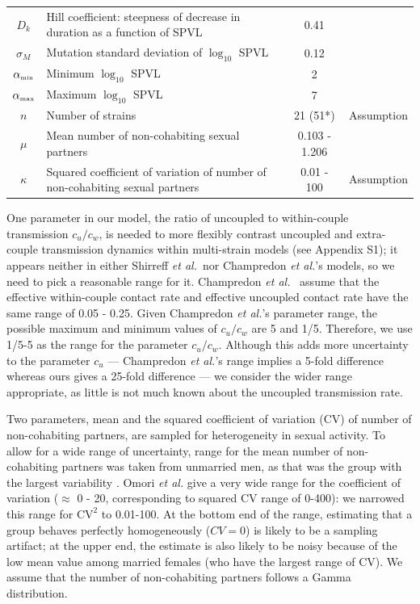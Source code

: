 \documentclass[10pt,letterpaper]{article}
\newcommand{\etal}{\textit{et al.}}
\newcommand{\tsub}[2]{#1_{{\textrm{\tiny #2}}}}
\begin{document}
\begin{table}[h!]
\begin{tabular}{c p{2in} c l}
$D_{k}$ & Hill coefficient: steepness of decrease in duration as a function of SPVL & 0.41 & \cite{shirreff_transmission_2011} \\
$\sigma_M$ & Mutation standard deviation of $\log_{10}$ SPVL & 0.12 & \cite{shirreff_transmission_2011} \\
$\tsub{\alpha}{min}$ & Minimum $\log_{10}$ SPVL & 2 & \cite{shirreff_transmission_2011}\\
$\tsub{\alpha}{max}$ & Maximum $\log_{10}$ SPVL & 7 & \cite{shirreff_transmission_2011}\\
$n$ & Number of strains & 21 (51*) & Assumption\\
$\mu$ & Mean number of non-cohabiting sexual partners & 0.103 - 1.206 & \cite{omori2015dynamics}\\
$\kappa$ & Squared coefficient of variation of number of non-cohabiting sexual partners & 0.01 - 100 & Assumption\\
\hline
\end{tabular}
\label{table:parmsTable}
\end{table}

One parameter in our model, the ratio of uncoupled to within-couple transmission $c_u/c_w$, is needed to more flexibly contrast uncoupled and extra-couple transmission dynamics within multi-strain models (see Appendix S1);
it appears neither in either Shirreff \etal\ nor Champredon \etal's models,  so we need to pick a reasonable range for it. Champredon \etal\ \cite{champredon_hiv_2013} assume that the effective within-couple contact rate and effective uncoupled contact rate have the same range of 0.05 - 0.25.  Given Champredon \etal's parameter range, the possible maximum and minimum values of $c_u/c_w$ are 5 and 1/5. Therefore, we use 1/5-5 as the range for the parameter $c_u/c_w$. Although this adds more uncertainty to the parameter $c_u$ --- Champredon \etal's range implies a 5-fold difference whereas ours gives a 25-fold difference --- we consider the wider range appropriate, as little is not much known about the uncoupled transmission rate.

Two parameters, mean and the squared coefficient of variation (CV) of number of non-cohabiting partners, are sampled for heterogeneity in sexual activity.
To allow for a wide range of uncertainty, range for the mean number of non-cohabiting partners was taken from unmarried men, as that was the group with the largest variability \cite{omori2015dynamics}. 
Omori \etal \cite{omori2015dynamics} give a very wide
range for the coefficient of variation ($\approx$ 0 - 20, corresponding
to squared CV range of 0-400):
we narrowed this range for $\textrm{CV}^2$ to 0.01-100.
At the bottom end of the range, estimating that a group behaves
perfectly homogeneously ($CV=0$) is likely to be a sampling artifact;
at the upper end, the estimate is also likely to be noisy because
of the low mean value among married females (who have the largest
range of CV). 
We assume that the number of non-cohabiting partners follows a Gamma distribution.
\end{document}
